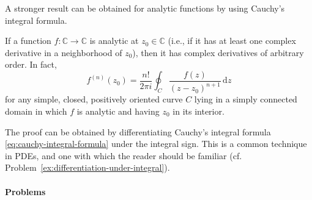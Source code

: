 A stronger result can be obtained for analytic functions by using Cauchy's integral formula.

\begin{Theorem}
\label{thm:analytic-infinite-differentiability}
If a function $f:\mathbb{C}\to\mathbb{C}$ is analytic at $z_0\in\mathbb{C}$ (i.e., if it has at least one complex derivative in a neighborhood of $z_0$), then it has complex derivatives of arbitrary order. In fact,
\begin{equation}\label{eq:cauchy-higher-derivatives}
f^{(n)}(z_0)=\dfrac{n!}{2\pi i}\oint_C\dfrac{f(z)}{(z-z_0)^{n+1}}\,\mathrm{d}z
\end{equation}
for any simple, closed, positively oriented curve $C$ lying in a simply connected domain in which $f$ is analytic and having $z_0$ in its interior.
\end{Theorem}

The proof can be obtained by differentiating Cauchy's integral formula \eqref{eq:cauchy-integral-formula} under the integral sign. This is a common technique in PDEs, and one with which the reader should be familiar (cf. Problem~\ref{ex:differentiation-under-integral}).

\paragraph*{Problems}

